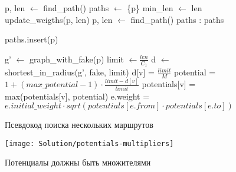 \begin{figure}
    \begin{algorithmic}
            \State p, len $\gets$ find\_path()
            \State paths $\gets$ \{p\}
            \State min\_len $\gets$ len
                \State update\_weigths(p, len)
                \State p, len $\gets$ find\_path()
                    \State \Return paths
                \EndIf
                :
                        \State \Return paths
                    \EndIf
                \EndFor

                \State paths.insert(p)
           \EndWhile
        \EndFunction

            \State g' $\gets$ graph\_with\_fake(p)
            \State limit $\gets \frac{len}{C_1}$
            \State d $\gets$ shortest\_in\_radius(g', fake, limit)
                \State d[v] = $\frac{limit}{M}$
            \EndFor
                \State potential = $1 + (max\_potential - 1) \cdot \frac{limit - d[v]}{limit}$
                \State potentials[v] = max(potentials[v], potential)
            \EndFor
                \State e.weight = $e.initial\_weight \cdot
                sqrt(potentials[e.from] \cdot potentials[e.to])$
            \EndFor
        \EndFunction
    \end{algorithmic}
    \caption{Псевдокод поиска нескольких маршрутов}
    \label{alg:multipath}
\end{figure}

\begin{figure}
    \texttt{[image: Solution/potentials-multipliers]}
    \caption{Потенциалы должны быть множителями}
    \label{fig:potentials-multipliers}
\end{figure}

